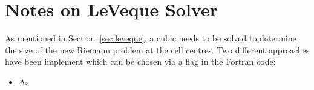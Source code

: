 \section{Notes on LeVeque Solver}

As mentioned in Section~\ref{sec:leveque}, a cubic needs to be solved to determine the size of the new Riemann problem at the cell centres. Two different approaches have been implement which can be chosen via a flag in the Fortran code:

\begin{itemize}
  \item As
\end{itemize}